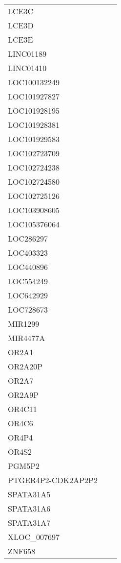 \begin{tabular}{lcc}
LCE3C              &    &         \\
LCE3D              &    &         \\
LCE3E              &    &         \\
LINC01189          &    &         \\
LINC01410          &    &         \\
LOC100132249       &    &         \\
LOC101927827       &    &         \\
LOC101928195       &    &         \\
LOC101928381       &    &         \\
LOC101929583       &    &         \\
LOC102723709       &    &         \\
LOC102724238       &    &         \\
LOC102724580       &    &         \\
LOC102725126       &    &         \\
LOC103908605       &    &         \\
LOC105376064       &    &         \\
LOC286297          &    &         \\
LOC403323          &    &         \\
LOC440896          &    &         \\
LOC554249          &    &         \\
LOC642929          &    &         \\
LOC728673          &    &         \\
MIR1299            &    &         \\
MIR4477A           &    &         \\
OR2A1              &    &         \\
OR2A20P            &    &         \\
OR2A7              &    &         \\
OR2A9P             &    &         \\
OR4C11             &    &         \\
OR4C6              &    &         \\
OR4P4              &    &         \\
OR4S2              &    &         \\
PGM5P2             &    &         \\
PTGER4P2-CDK2AP2P2 &    &         \\
SPATA31A5          &    &         \\
SPATA31A6          &    &         \\
SPATA31A7          &    &         \\
XLOC\_007697        &    &         \\
ZNF658             &    &         \\
\bottomrule
\end{tabular}

